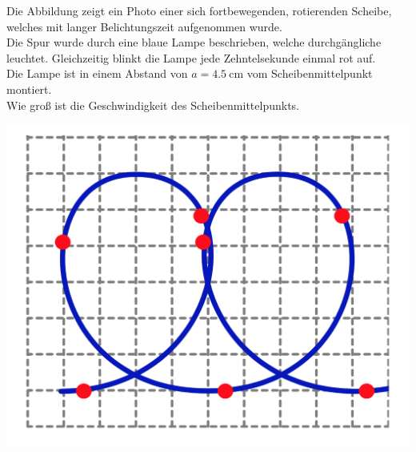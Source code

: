 \flushleft
\begin{minipage}{.75\textwidth}
\begin{Exercise}[label = rotdisk, title = Rotierende Scheibe, difficulty = 2, origin = Jaan Kalda ]
Die Abbildung zeigt ein Photo einer sich fortbewegenden, rotierenden Scheibe, welches mit langer Belichtungszeit aufgenommen wurde.\\
Die Spur wurde durch eine blaue Lampe beschrieben, welche durchgängliche leuchtet. Gleichzeitig blinkt die Lampe jede  Zehntelsekunde einmal rot auf.\\
Die Lampe ist in einem Abstand von $a =4.5~\mathrm{cm}$ vom Scheibenmittelpunkt montiert.\\
Wie groß ist die Geschwindigkeit des Scheibenmittelpunkts.
\end{Exercise}
\end{minipage}
\hfill
\begin{minipage}{.2\textwidth}
	\centering
\includegraphics[scale = .2]{../tasks/kalda/rotdisk.png}
\end{minipage}
